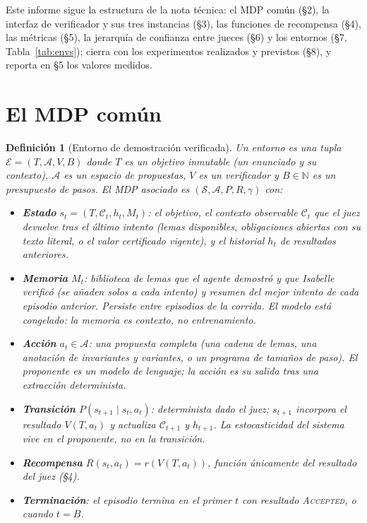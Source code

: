 \documentclass[11pt,a4paper]{article}
\newtheorem{definition}{Definición}
\begin{document}
Este informe sigue la estructura de la nota técnica: el MDP común (§2), la interfaz de verificador y sus tres instancias (§3), las funciones de recompensa (§4), las métricas (§5), la jerarquía de confianza entre jueces (§6) y los entornos (§7, Tabla~\ref{tab:envs}); cierra con los experimentos realizados y previstos (§8), y reporta en §5 los valores medidos.

\section{El MDP común}

\begin{definition}[Entorno de demostración verificada]
Un entorno es una tupla $\mathcal{E} = (T, \mathcal{A}, V, B)$ donde $T$ es un \emph{objetivo} inmutable (un enunciado y su contexto), $\mathcal{A}$ es un espacio de \emph{propuestas}, $V$ es un \emph{verificador} y $B \in \mathbb{N}$ es un presupuesto de pasos. El MDP asociado es $(\mathcal{S}, \mathcal{A}, P, R, \gamma)$ con:
\begin{itemize}
  \item \textbf{Estado} $s_t = (T, \mathcal{C}_t, h_t, M_t)$: el objetivo, el \emph{contexto observable} $\mathcal{C}_t$ que el juez devuelve tras el último intento (lemas disponibles, obligaciones abiertas con su texto literal, o el valor certificado vigente), y el historial $h_t$ de resultados anteriores.
  \item \textbf{Memoria} $M_t$: biblioteca de lemas que el agente demostró y que Isabelle verificó (se añaden solos a cada intento) y resumen del mejor intento de cada episodio anterior. Persiste entre episodios de la corrida. El modelo está congelado: la memoria es contexto, no entrenamiento.
  \item \textbf{Acción} $a_t \in \mathcal{A}$: una propuesta completa (una cadena de lemas, una anotación de invariantes y variantes, o un programa de tamaños de paso). El proponente es un modelo de lenguaje; la acción es su salida tras una extracción determinista.
  \item \textbf{Transición} $P(s_{t+1} \mid s_t, a_t)$: determinista dado el juez; $s_{t+1}$ incorpora el resultado $V(T, a_t)$ y actualiza $\mathcal{C}_{t+1}$ y $h_{t+1}$. La estocasticidad del sistema vive en el proponente, no en la transición.
  \item \textbf{Recompensa} $R(s_t, a_t) = r(V(T, a_t))$, función únicamente del resultado del juez (§4).
  \item \textbf{Terminación}: el episodio termina en el primer $t$ con resultado \textsc{Accepted}, o cuando $t = B$.
\end{itemize}
\end{definition}
\end{document}

